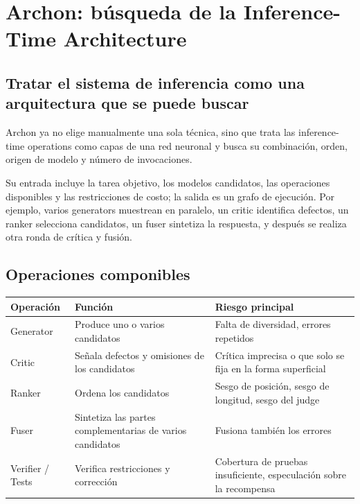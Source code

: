 \section{Archon: búsqueda de la Inference-Time Architecture}

\subsection{Tratar el sistema de inferencia como una arquitectura que se puede buscar}

Archon ya no elige manualmente una sola técnica, sino que trata las inference-time operations como capas de una red neuronal y busca su combinación, orden, origen de modelo y número de invocaciones.


Su entrada incluye la tarea objetivo, los modelos candidatos, las operaciones disponibles y las restricciones de costo; la salida es un grafo de ejecución. Por ejemplo, varios generators muestrean en paralelo, un critic identifica defectos, un ranker selecciona candidatos, un fuser sintetiza la respuesta, y después se realiza otra ronda de crítica y fusión.

\subsection{Operaciones componibles}


\begin{table}[H]
\centering
\small
\begin{tabular}{p{2.8cm}p{5.1cm}p{5.7cm}}
\toprule
\textbf{Operación} & \textbf{Función} & \textbf{Riesgo principal} \\
\midrule
Generator & Produce uno o varios candidatos & Falta de diversidad, errores repetidos \\
Critic & Señala defectos y omisiones de los candidatos & Crítica imprecisa o que solo se fija en la forma superficial \\
Ranker & Ordena los candidatos & Sesgo de posición, sesgo de longitud, sesgo del judge \\
Fuser & Sintetiza las partes complementarias de varios candidatos & Fusiona también los errores \\
Verifier / Tests & Verifica restricciones y corrección & Cobertura de pruebas insuficiente, especulación sobre la recompensa \\
\bottomrule
\end{tabular}
\end{table}

